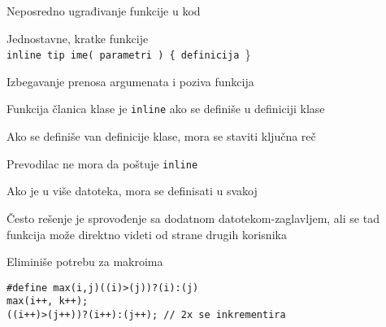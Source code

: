 \documentclass{article}
\newenvironment{xitemize}{%
    
    \itemize
    \larger
}{%
    \enditemize
}
\let\olditemize\itemize
\let\endolditemize\enditemize
\renewenvironment{itemize}{%
    \smaller
    \olditemize
}{%
    \endolditemize
}
\providecommand{\inlinecode}[1]{\texttt{#1}}
\begin{document}
\begin{xitemize}
\item Neposredno ugrađivanje funkcije u kod
\begin{itemize}
    \item Jednostavne, kratke funkcije\\
    \inlinecode{inline tip ime( parametri ) \{ definicija }\}
    \item Izbegavanje prenosa argumenata i poziva funkcija
    \item Funkcija članica klase je \inlinecode {inline} ako se definiše u definiciji klase
    \item Ako se definiše van definicije klase, mora se staviti ključna reč
    \item Prevodilac ne mora da poštuje \inlinecode {inline}
    \item Ako je u više datoteka, mora se definisati u svakoj
    \item Često rešenje je sprovođenje sa dodatnom datotekom-zaglavljem, ali se tad funkcija može direktno videti od strane drugih korisnika
    \item Eliminiše potrebu za makroima
    \begin{lstlisting}
#define max(i,j)((i)>(j))?(i):(j)
max(i++, k++);
((i++)>(j++))?(i++):(j++); // 2x se inkrementira
    \end{lstlisting}
\end{itemize}


\end{xitemize}
\end{document}
